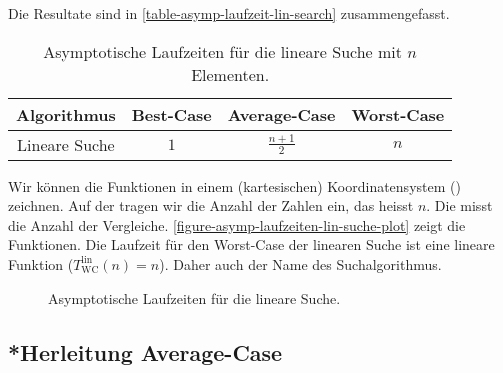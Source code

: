 Die Resultate sind in \autoref{table-asymp-laufzeit-lin-search} zusammengefasst.

\begin{table}[htb]
\centering
\begin{tabular}{|c|c|c|c|}
\hline
Algorithmus & Best-Case & Average-Case & Worst-Case \\ \hline
Lineare Suche & $1$ & $\frac{n+1}{2}$ & $n$ \\ \hline
\end{tabular}
\caption{Asymptotische Laufzeiten für die lineare Suche mit $n$ Elementen.}
\label{table-asymp-laufzeit-lin-search}
\end{table}

Wir können die Funktionen in einem (kartesischen) Koordinatensystem () zeichnen. Auf der  tragen wir die Anzahl der Zahlen ein, das heisst $n$. Die  misst die Anzahl der Vergleiche. \autoref{figure-asymp-laufzeiten-lin-suche-plot} zeigt die Funktionen. Die Laufzeit für den Worst-Case der linearen Suche ist eine lineare Funktion ($T_{\text{WC}}^{\text{lin}}(n) = n$). Daher auch der Name des Suchalgorithmus.

\begin{figure}[htb]
	\centering
{}
\caption{Asymptotische Laufzeiten für die lineare Suche.}
\label{figure-asymp-laufzeiten-lin-suche-plot}
\end{figure}

\subsection{*Herleitung Average-Case}

